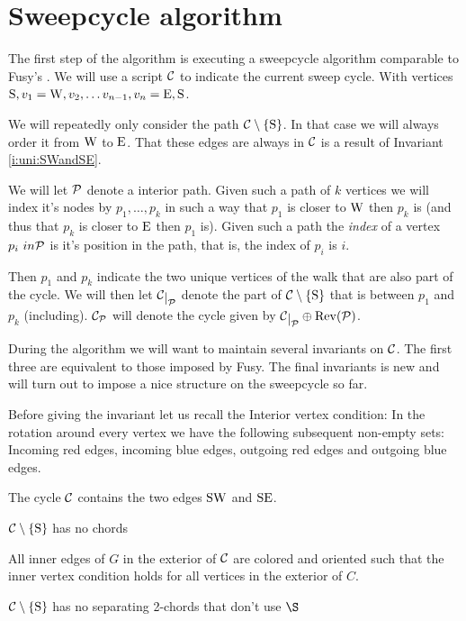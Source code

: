 
\section{Sweepcycle algorithm}
  \label{s:sweep}
  The first step of the algorithm is executing a sweepcycle algorithm comparable to Fusy's \cite{Fusy2006}. We will use a script $\C$ to indicate the current sweep cycle. With vertices $\pS, v_1 = \pW, v_2, \ldots v_{n-1}, v_n = \pE, \pS$.

  We will repeatedly only consider the path $\cpath$. In that case we will always order it from $\pW$ to $\pE$. That these edges are always in $\C$ is a result of Invariant \ref{i:uni:SWandSE}.

  We will let $\P$ denote a interior path. Given such a path of $k$ vertices we will index it's nodes by $p_1, \ldots, p_k$ in such a way that $p_1$ is closer to $\pW$ then $p_k$ is (and thus that $p_k$ is closer to $\pE$ then $p_1$ is). Given such a path the \emph{index} of a vertex $p_i\ in \P$ is it's position in the path, that is, the index of $p_i$ is $i$.

  Then $p_1$ and $p_k$ indicate the two unique vertices of the walk that are also part of the cycle. We will then let $\restC{\P}$ denote the part of $\cpath$ that is between $p_1$ and $p_k$ (including). $\C_\P$ will denote the cycle given by $\restC{\P} \oplus \rev(\P)$.

  During the algorithm we will want to maintain several invariants on $\C$. The first three are equivalent to those imposed by Fusy. The final invariants is new and will turn out to impose a nice structure on the sweepcycle so far.

  Before giving the invariant let us recall the Interior vertex condition: In the rotation around every vertex we have the following subsequent non-empty sets: Incoming red edges, incoming blue edges, outgoing red edges and outgoing blue edges.

  \begin{invariants}
    \itemsep=-4pt

    \item \label{i:uni:SWandSE} The cycle $\C$ contains the two edges $\pS \pW$ and $\pS \pE$.
    \item \label{i:uni:noChords} $\cpath$ has no chords
    \item \label{i:uni:intVertCond} All inner edges of $G$ in the exterior of $\C$ are colored and oriented such that the inner vertex condition holds for all vertices in the exterior of $C$.
    \item \label{i:uni:no2Chords} $\C\sm{\pS}$ has no separating 2-chords that don't use $\S$
  \end{invariants}

